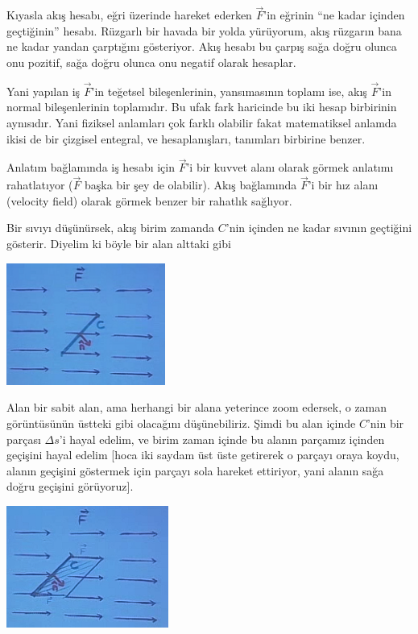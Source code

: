 \documentclass[12pt,fleqn]{article}\usepackage{../../common}
\begin{document}
Kıyasla akış hesabı, eğri üzerinde hareket ederken $\vec{F}$'in eğrinin ``ne
kadar içinden geçtiğinin'' hesabı. Rüzgarlı bir havada bir yolda yürüyorum, akış
rüzgarın bana ne kadar yandan çarptığını gösteriyor. Akış hesabı bu çarpış sağa
doğru olunca onu pozitif, sağa doğru olunca onu negatif olarak hesaplar.

Yani yapılan iş $\vec{F}$'in teğetsel bileşenlerinin, yansımasının toplamı
ise, akış $\vec{F}$'in normal bileşenlerinin toplamıdır. Bu ufak fark
haricinde bu iki hesap birbirinin aynısıdır. Yani fiziksel anlamları çok
farklı olabilir fakat matematiksel anlamda ikisi de bir çizgisel entegral,
ve hesaplanışları, tanımları birbirine benzer. 

Anlatım bağlamında iş hesabı için $\vec{F}$'i bir kuvvet alanı olarak görmek
anlatımı rahatlatıyor ($\vec{F}$ başka bir şey de olabilir). Akış
bağlamında $\vec{F}$'i bir hız alanı (velocity field) olarak görmek
benzer bir rahatlık sağlıyor. 

Bir sıvıyı düşünürsek, akış birim zamanda $C$'nin içinden ne kadar sıvının
geçtiğini gösterir. Diyelim ki böyle bir alan alttaki gibi

\begin{center}
\includegraphics[height=4cm]{23_3.png}
\end{center}

Alan bir sabit alan, ama herhangi bir alana yeterince zoom edersek, o zaman
görüntüsünün üstteki gibi olacağını düşünebiliriz. Şimdi bu alan içinde
$C$'nin bir parçası $\Delta s$'i hayal edelim, ve birim zaman içinde bu
alanın parçamız içinden geçişini hayal edelim [hoca iki saydam üst üste
getirerek o parçayı oraya koydu, alanın geçişini göstermek için parçayı
sola hareket ettiriyor, yani alanın sağa doğru geçişini görüyoruz].

\begin{center}
\includegraphics[height=4cm]{23_4.png}
\end{center}
\end{document}
